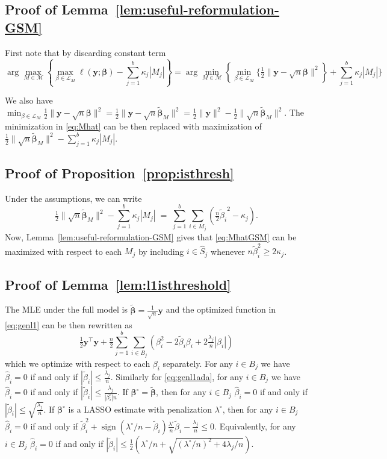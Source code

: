 \documentclass[aos]{imsart}
\theoremstyle{plain}
\newcommand{\bs}{\boldsymbol}
\begin{document}
\begin{supplement}
\subsection{Proof of Lemma~\ref{lem:useful-reformulation-GSM}}
First note that by discarding constant term 
 $$\arg\max_{M\in \mathcal{M}} \left\{\max_{\beta\in \mathcal{L}_M}\ell(\bs y; \bs \beta)-\sum_{j=1}^b\kappa_j |M_j| \right\}=\arg\min_{M\in \mathcal{M}} \left\{\min_{\beta\in \mathcal{L}_M}\bigg\{ \tfrac{1}{2}\|\bs y-\sqrt{n}\bs\beta\|^2\right\}+\sum_{j=1}^b\kappa_j |M_j| \bigg\}$$
 
 We also have $\min_{\beta\in \mathcal{L}_M} \tfrac{1}{2}\|\bs y-\sqrt{n}\bs\beta\|^2=\tfrac{1}{2}\|\bs y-\sqrt{n}\tilde{\bs \beta}_M\|^2=\tfrac{1}{2}\|\bs y\|^2-\tfrac{1}{2}\|\sqrt{n}\tilde{\bs \beta}_M\|^2$. The minimization in \eqref{eq:Mhat} can be then replaced with maximization of $\tfrac{1}{2}
 \|\sqrt{n}\tilde{\bs \beta}_M\|^2-\sum_{j=1}^b \kappa_j|M_j|$.

\subsection{Proof of Proposition~\ref{prop:isthresh}}
	Under the assumptions, we can write 
	$$
	\tfrac{1}{2}\|\sqrt{n}\tilde{\bs \beta}_M\|^2-\sum_{j=1}^b\kappa_j |M_j|\;=\;\sum_{j=1}^b\sum_{i\in M_j}(\tfrac{n}{2}{\tilde{ \beta}_i}^2-\kappa_j).
	$$
	Now, Lemma~\ref{lem:useful-reformulation-GSM} gives that \eqref{eq:MhatGSM} can be maximized with respect to each $M_j$ by including $i\in \hat S_j$ whenever $n\tilde\beta_i^2\geq 2\kappa_j$.

\subsection{Proof of Lemma~\ref{lem:l1isthreshold}}
	The MLE under the full model is $\tilde{\bs\beta}=\tfrac{1}{\sqrt{n}} \bs y$ and the optimized function in \eqref{eq:genl1} can be then rewritten as
	$$
	\tfrac{1}{2}\bs y^{\top}\bs y +\tfrac{n}{2}\sum_{j=1}^b\sum_{i\in B_j}\left(\beta_i^2-2\tilde\beta_i\beta_i+2\tfrac{\lambda_j}{n}|\beta_i|\right)
	$$
	which we optimize with respect to each $\beta_i$ separately. For any $i\in B_j$ we have $\hat\beta_i=0$ if and only if $|\tilde \beta_i|\leq \frac{\lambda_j}{n}$. Similarly  for \eqref{eq:genl1ada}, for any $i\in B_j$ we have $\hat\beta_i=0$ if and only if $|\tilde \beta_i|\leq \frac{\lambda_j}{|\beta^{\circ}_i|n}$. If $\bs \beta^{\circ}= \tilde{\bs\beta}$, then for any $i\in B_j$ $\hat{\beta}_i = 0$ if and only if $|\tilde \beta_i|\leq \sqrt{\tfrac{\lambda_j}{n}}$. If $\bs\beta^\circ$ is a LASSO estimate with penalization $\lambda^\circ$, then for any $i\in B_j$ 
 $\hat{\beta}_i = 0$ if and only if $\tilde{\beta}^2_i + \operatorname{sign}(\lambda^{\circ}/n-\tilde{\beta}_i) \frac{\lambda^\circ}{n}\tilde{\beta}_i-\frac{\lambda_j}{n} \leq 0$. Equivalently, for any $i\in B_j$ 
 $\hat{\beta}_i = 0$ if and only if $|\tilde{\beta}_ i| \leq  \frac{1}{2}\left(\lambda^\circ/n+\sqrt{(\lambda^\circ/n)^2+4 \lambda_j/n}\right)$.



\end{supplement}
\end{document}
